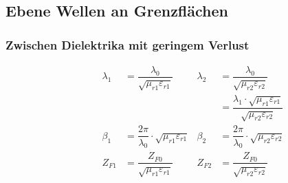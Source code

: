 \subsection{Ebene Wellen an Grenzflächen}
\subsubsection{Zwischen Dielektrika mit geringem Verlust}


\begin{align*}
    \quad \qquad \lambda_1 & = \dfrac{\lambda_0}{\sqrt{\mu_{r1}\varepsilon_{r1}}}          & \lambda_2 & = \dfrac{\lambda_0}{\sqrt{\mu_{r2}\varepsilon_{r2}}}                                     \\
    \quad \qquad           &                                                               &           & = \dfrac{\lambda_1\cdot\sqrt{\mu_{r1}\varepsilon_{r1}}}{\sqrt{\mu_{r2}\varepsilon_{r2}}} \\
    \quad \qquad \beta_1   & = \dfrac{2\pi}{\lambda_0}\cdot\sqrt{\mu_{r1}\varepsilon_{r1}} & \beta_2   & = \dfrac{2\pi}{\lambda_0}\cdot\sqrt{\mu_{r2}\varepsilon_{r2}}                            \\
    \quad \qquad Z_{F1}    & = \dfrac{Z_{F0}}{\sqrt{\mu_{r1}\varepsilon_{r1}}}             & Z_{F2}    & = \dfrac{Z_{F0}}{\sqrt{\mu_{r2}\varepsilon_{r2}}}
\end{align*}

%

